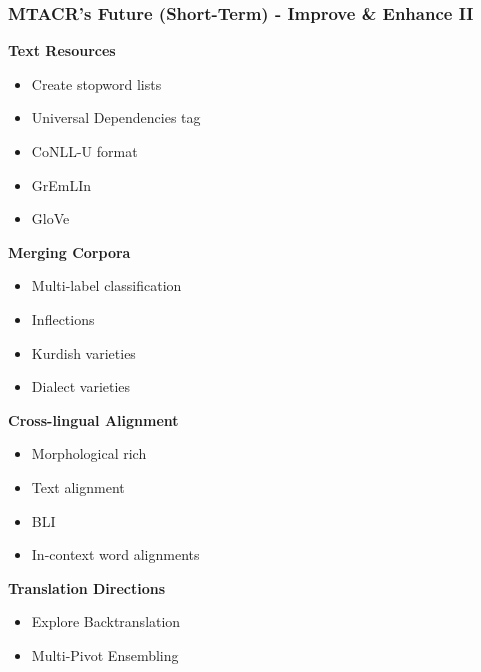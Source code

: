 \documentclass[aspectratio=169]{beamer}
\begin{document}
\begin{frame}[fragile]
	\frametitle{MTACR's Future (Short-Term) - Improve \& Enhance II}
    \begin{minipage}{.50\textwidth}
    \footnotesize
    \textbf{Text Resources}
    \begin{itemize}
        \item Create stopword lists
        \item Universal Dependencies tag \citep{demarneffe2021UniversalDependencies}
        \item CoNLL-U format \citep{buchholz2006CoNLLXSharedTask}
        \item GrEmLIn \citep{gurgurov2025GrEmLInRepositoryGreen} %
        \item GloVe \citep{pennington2014GloVeGlobalVectors}
    \end{itemize}
    \textbf{Merging Corpora}
    \begin{itemize}
        \item Multi-label classification \citep{bernier-colborne2023DialectVariantIdentification, marchal2022EstablishingAnnotationQuality, fornaciari2021BlackWhiteLeveraging, plank2022ProblemHumanLabel}
        \item Inflections \citep{metheniti2020WikinflectionCorpusBetter} %
        \item Kurdish varieties \citep{ahmadi2023ApproachesCorpusCreation, ahmadi2022LeveragingMultilingualNews}
        \item Dialect varieties \citep{alam2023CODETBenchmarkContrastive}
    \end{itemize}
    \end{minipage}%
    \begin{minipage}{.50\textwidth}
    \footnotesize
    \textbf{Cross-lingual Alignment}
    \begin{itemize}
        \item Morphological rich \citep{ustun2019CrossLingualWordEmbeddingsMorphologically} %
        \item Text alignment \citep{artetxe2019MassivelyMultilingualSentence} %
        \item BLI \citep{bafna2024WhenYourCousin, bafna2023SimpleMethodUnsupervised, artemova2023LowresourceBilingualDialect}
        \item In-context word alignments \citep{martelli2023XLWAGoldEvaluation} %
    \end{itemize}
    \textbf{Translation Directions}
    \begin{itemize}
        \item Explore Backtranslation \citep{edunov2018UnderstandingBackTranslationScale}
        \item Multi-Pivot Ensembling \citep{mohammadshahi2023InvestigatingMultiPivotEnsembling} %
    \end{itemize}
    \end{minipage}
\end{frame}
\end{document}
